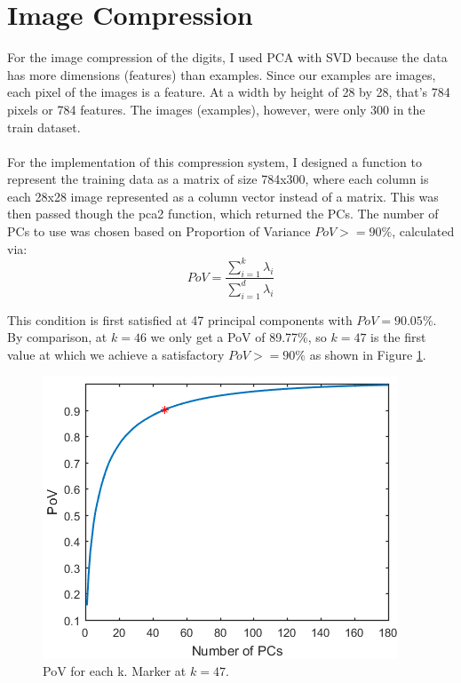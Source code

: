 \documentclass[a4paper,11pt,twocolumn]{article}
\begin{document}
\section{Image Compression}
For the image compression of the digits, I used PCA with SVD because the data has more dimensions (features) than examples. Since our examples are images, each pixel of the images is a feature. At a width by height of 28 by 28, that's 784 pixels or 784 features. The images (examples), however, were only 300 in the train dataset.
\\\\
For the implementation of this compression system, I designed a function to represent the training data as a matrix of size 784x300, where each column is each 28x28 image represented as a column vector instead of a matrix. This was then passed though the pca2 function, which returned the PCs. The number of PCs to use was chosen based on Proportion of Variance $PoV >= 90\%$, calculated via:
$$PoV = \frac{\sum_{i=1}^{k} \lambda_{i}}{\sum_{i=1}^{d} \lambda_{i}}$$

This condition is first satisfied at 47 principal components with $PoV = 90.05\%$. By comparison, at $k = 46$ we only get a PoV of 89.77\%, so $k = 47$ is the first value at which we achieve a satisfactory $PoV >= 90\%$ as shown in Figure \ref{fig:fig4}.

\begin{figure}[!h]
  \centering
  \includegraphics[width=\linewidth]{figures/PoV.png}
  \caption{PoV for each k. Marker at $k = 47$.}
  \label{fig:fig4}
\end{figure}
\end{document}

